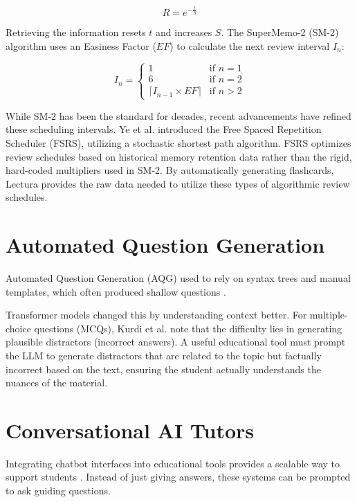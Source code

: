 \begin{equation}
    R = e^{-\frac{t}{S}}
\end{equation}

Retrieving the information resets $t$ and increases $S$. The SuperMemo-2 (SM-2) algorithm uses an Easiness Factor ($EF$) to calculate the next review interval $I_n$:

\begin{equation}
    I_n = 
    \begin{cases} 
      1 & \text{if } n = 1 \\
      6 & \text{if } n = 2 \\
      \lceil I_{n-1} \times EF \rceil & \text{if } n > 2 
   \end{cases}
\end{equation}

While SM-2 has been the standard for decades, recent advancements have refined these scheduling intervals. Ye et al. \cite{ye2022stochastic} introduced the Free Spaced Repetition Scheduler (FSRS), utilizing a stochastic shortest path algorithm. FSRS optimizes review schedules based on historical memory retention data rather than the rigid, hard-coded multipliers used in SM-2. By automatically generating flashcards, Lectura provides the raw data needed to utilize these types of algorithmic review schedules.

\section{Automated Question Generation}
Automated Question Generation (AQG) used to rely on syntax trees and manual templates, which often produced shallow questions \cite{kurdi2020systematic}. 

Transformer models changed this by understanding context better. For multiple-choice questions (MCQs), Kurdi et al. \cite{kurdi2020systematic} note that the difficulty lies in generating plausible distractors (incorrect answers). A useful educational tool must prompt the LLM to generate distractors that are related to the topic but factually incorrect based on the text, ensuring the student actually understands the nuances of the material.

\section{Conversational AI Tutors}
Integrating chatbot interfaces into educational tools provides a scalable way to support students \cite{winkler2020conversational}. Instead of just giving answers, these systems can be prompted to ask guiding questions. 

